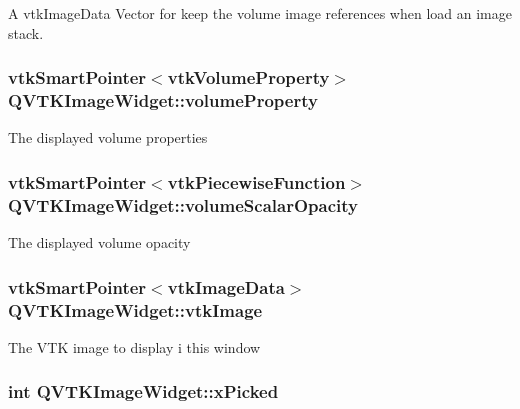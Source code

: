 A vtk\-Image\-Data Vector for keep the volume image references when load an image stack. 

\hypertarget{class_q_v_t_k_image_widget_ab354f6ff492086cf9abd53a371fa79f7}{
\subsubsection[{volume\-Property}]{\setlength{\rightskip}{0pt plus 5cm}vtk\-Smart\-Pointer$<$vtk\-Volume\-Property$>$ {\bf Q\-V\-T\-K\-Image\-Widget\-::volume\-Property}}}\label{d8/dd7/class_q_v_t_k_image_widget_ab354f6ff492086cf9abd53a371fa79f7}
The displayed volume properties \hypertarget{class_q_v_t_k_image_widget_afd1074dad297031f5f2171681b8c85fc}{
\subsubsection[{volume\-Scalar\-Opacity}]{\setlength{\rightskip}{0pt plus 5cm}vtk\-Smart\-Pointer$<$vtk\-Piecewise\-Function$>$ {\bf Q\-V\-T\-K\-Image\-Widget\-::volume\-Scalar\-Opacity}}}\label{d8/dd7/class_q_v_t_k_image_widget_afd1074dad297031f5f2171681b8c85fc}
The displayed volume opacity \hypertarget{class_q_v_t_k_image_widget_aa55aaf6e037ee4d789449ff3d365201b}{
\subsubsection[{vtk\-Image}]{\setlength{\rightskip}{0pt plus 5cm}vtk\-Smart\-Pointer$<$vtk\-Image\-Data$>$ {\bf Q\-V\-T\-K\-Image\-Widget\-::vtk\-Image}}}\label{d8/dd7/class_q_v_t_k_image_widget_aa55aaf6e037ee4d789449ff3d365201b}
The V\-T\-K image to display i this window \hypertarget{class_q_v_t_k_image_widget_a17897def9ef084b36378099c51f94be3}{
\subsubsection[{x\-Picked}]{\setlength{\rightskip}{0pt plus 5cm}int {\bf Q\-V\-T\-K\-Image\-Widget\-::x\-Picked}}}\label{d8/dd7/class_q_v_t_k_image_widget_a17897def9ef084b36378099c51f94be3}
